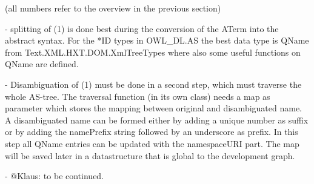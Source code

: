 \documentclass[11pt,a4paper]{article}
\begin{document}
(all numbers refer to the overview in the previous section)


- splitting of (1) is done best during the conversion of the ATerm
  into the abstract syntax. For the *ID types in OWL\_DL.AS the best
  data type is QName from Text.XML.HXT.DOM.XmlTreeTypes where also
  some useful functions on QName are defined.

- Disambiguation of (1) must be done in a second step, which must
  traverse the whole AS-tree. The traversal function (in its own
  class) needs a map as parameter which stores the mapping between
  original and disambiguated name. A disambiguated name can be formed
  either by adding a unique number as suffix or by adding the
  namePrefix string followed by an underscore as prefix.  In this step
  all QName entries can be updated with the namespaceURI part.
  The map will be saved later in a datastructure that is global to the
  development graph.

- @Klaus: to be continued. 
\end{document}
